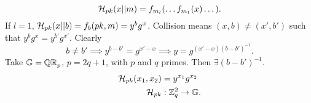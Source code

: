 \begin{equation*}
	\mathcal{H}_{pk}(x || m) = f_{m_l}( \dots f_{m_1} (x) \dots).
\end{equation*}
If $l = 1$, $\mathcal{H}_{pk}(x || b) = f_b(pk, m) = y^{b} g^x$.
Collision means $(x, b) \neq (x', b')$ such that $y^b g^x = y^{b'} g^{x'}$.
Clearly
\begin{equation*}
	b \neq b' \implies y^{b-b'} = g^{x'-x} \implies y = g^{(x'-x)(b-b')^{-1}}.
\end{equation*}
Take $\mathbb{G} = \mathbb{QR}_{p}$, $p = 2q + 1$, with $p$ and $q$ primes.
Then $\exists (b - b')^{-1}$.
\begin{align*}
	\mathcal{H}_{pk}(x_1, x_2) & = y^{x_1} g^{x_2} \\
	\mathcal{H}_{pk} & : \mathbb{Z}_q^2 \to \mathbb{G}.
\end{align*}

